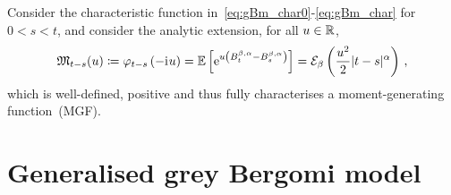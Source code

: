 Consider the characteristic function in~\eqref{eq:gBm_char0}-\eqref{eq:gBm_char}
for $0<s<t$, and consider the analytic extension, for all $u\in\mathbb{R}$,
\begin{equation}\label{eq:ggBmMGF}
    \mathfrak{M}_{t-s}(u)
    \coloneqq \varphi_{t-s}\left(-{\mathrm{i}\mkern1mu} u\right)
    = \mathbb{E}\left[\mathrm{e}^{ u\left(B_t^{\beta, \alpha}-B_s^{\beta, \alpha}\right)}\right]
    = \mathcal{E}_{\beta}\left(\frac{u^2}{2}|t-s|^\alpha\right)\,,
\end{equation}
which is well-defined, positive and thus fully characterises a moment-generating function~(MGF).


\section{Generalised grey Bergomi model}\label{sec:ggBergomi}

